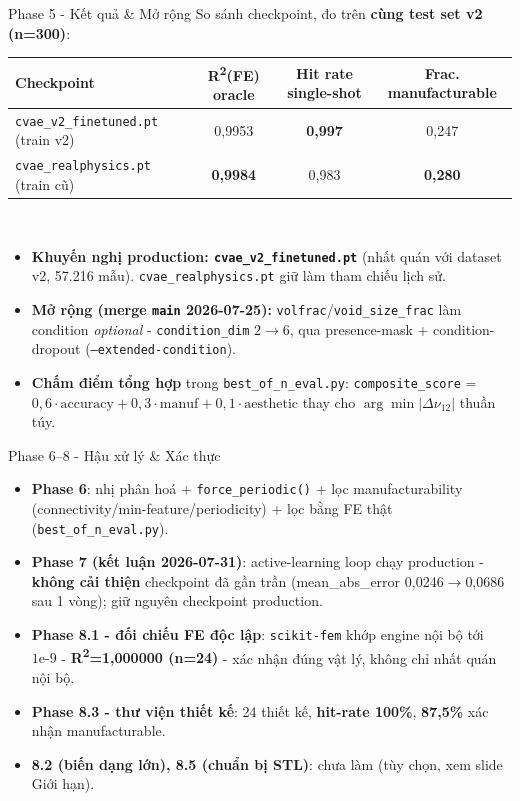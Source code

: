 \documentclass[aspectratio=169,11pt]{beamer}
\begin{document}
\begin{frame}{Phase 5 - Kết quả \& Mở rộng}
  \centering\scriptsize
  So sánh checkpoint, đo trên \textbf{cùng test set v2 (n=300)}:
  \begin{tabular}{@{}lccc@{}}
    \toprule
    Checkpoint & R\textsuperscript{2}(FE) oracle & Hit rate single-shot & Frac. manufacturable \\ \midrule
    \texttt{cvae\_v2\_finetuned.pt} (train v2) & 0,9953 & \textbf{0,997} & 0,247 \\
    \texttt{cvae\_realphysics.pt} (train cũ) & \textbf{0,9984} & 0,983 & \textbf{0,280} \\
    \bottomrule
  \end{tabular}
  \vspace{2mm}\\
  \raggedright\small
  \begin{itemize}
    \item \textbf{Khuyến nghị production: \texttt{cvae\_v2\_finetuned.pt}} (nhất quán với dataset v2, 57.216 mẫu). \texttt{cvae\_realphysics.pt} giữ làm tham chiếu lịch sử.
    \item \textbf{Mở rộng (merge \texttt{main} 2026-07-25):} \texttt{volfrac}/\texttt{void\_size\_frac} làm condition \emph{optional} - \texttt{condition\_dim} $2\to 6$, qua presence-mask + condition-dropout (\texttt{--extended-condition}).
    \item \textbf{Chấm điểm tổng hợp} trong \texttt{best\_of\_n\_eval.py}: \texttt{composite\_score} = $0{,}6\!\cdot\!\text{accuracy} + 0{,}3\!\cdot\!\text{manuf} + 0{,}1\!\cdot\!\text{aesthetic}$ thay cho $\arg\min|\Delta\nu_{12}|$ thuần túy.
  \end{itemize}
\end{frame}

\begin{frame}{Phase 6--8 - Hậu xử lý \& Xác thực}
  \begin{itemize}
    \item \textbf{Phase 6}: nhị phân hoá + \texttt{force\_periodic()} + lọc manufacturability (connectivity/min-feature/periodicity) + lọc bằng FE thật (\texttt{best\_of\_n\_eval.py}).
    \item \textbf{Phase 7 (kết luận 2026-07-31)}: active-learning loop chạy production - \textbf{không cải thiện} checkpoint đã gần trần (mean\_abs\_error 0,0246$\to$0,0686 sau 1 vòng); giữ nguyên checkpoint production.
    \item \textbf{Phase 8.1 - đối chiếu FE độc lập}: \texttt{scikit-fem} khớp engine nội bộ tới $1\text{e-}9$ - \textbf{R\textsuperscript{2}=1,000000 (n=24)} - xác nhận đúng vật lý, không chỉ nhất quán nội bộ.
    \item \textbf{Phase 8.3 - thư viện thiết kế}: 24 thiết kế, \textbf{hit-rate 100\%}, \textbf{87,5\%} xác nhận manufacturable.
    \item \textbf{8.2 (biến dạng lớn), 8.5 (chuẩn bị STL)}: chưa làm (tùy chọn, xem slide Giới hạn).
  \end{itemize}
\end{frame}
\end{document}
